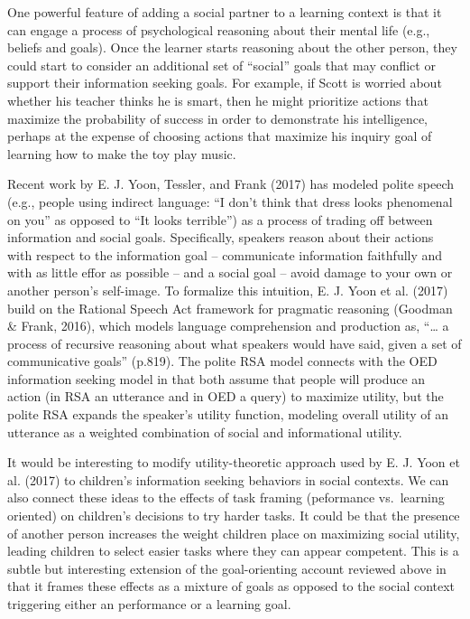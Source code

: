 \documentclass[english,floatsintext,man]{apa6}
\theoremstyle{definition}
\theoremstyle{definition}
\theoremstyle{definition}
\theoremstyle{remark}
\begin{document}
One powerful feature of adding a social partner to a learning context is
that it can engage a process of psychological reasoning about their
mental life (e.g., beliefs and goals). Once the learner starts reasoning
about the other person, they could start to consider an additional set
of \enquote{social} goals that may conflict or support their information
seeking goals. For example, if Scott is worried about whether his
teacher thinks he is smart, then he might prioritize actions that
maximize the probability of success in order to demonstrate his
intelligence, perhaps at the expense of choosing actions that maximize
his inquiry goal of learning how to make the toy play music.

Recent work by E. J. Yoon, Tessler, and Frank (2017) has modeled polite
speech (e.g., people using indirect language: \enquote{I don't think
that dress looks phenomenal on you} as opposed to \enquote{It looks
terrible}) as a process of trading off between information and social
goals. Specifically, speakers reason about their actions with respect to
the information goal -- communicate information faithfully and with as
little effor as possible -- and a social goal -- avoid damage to your
own or another person's self-image. To formalize this intuition, E. J.
Yoon et al. (2017) build on the Rational Speech Act framework for
pragmatic reasoning (Goodman \& Frank, 2016), which models language
comprehension and production as, \enquote{\ldots{} a process of
recursive reasoning about what speakers would have said, given a set of
communicative goals} (p.819). The polite RSA model connects with the OED
information seeking model in that both assume that people will produce
an action (in RSA an utterance and in OED a query) to maximize utility,
but the polite RSA expands the speaker's utility function, modeling
overall utility of an utterance as a weighted combination of social and
informational utility.

It would be interesting to modify utility-theoretic approach used by E.
J. Yoon et al. (2017) to children's information seeking behaviors in
social contexts. We can also connect these ideas to the effects of task
framing (peformance vs.~learning oriented) on children's decisions to
try harder tasks. It could be that the presence of another person
increases the weight children place on maximizing social utility,
leading children to select easier tasks where they can appear competent.
This is a subtle but interesting extension of the goal-orienting account
reviewed above in that it frames these effects as a mixture of goals as
opposed to the social context triggering either an performance or a
learning goal.
\end{document}
